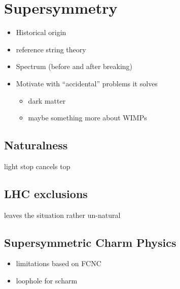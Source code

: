 \section{Supersymmetry}
\begin{itemize}
\item Historical origin
\item reference string theory
\item Spectrum (before and after breaking)
\item Motivate with ``accidental'' problems it solves
\begin{itemize}
  \item dark matter
  \item maybe something more about WIMPs
\end{itemize}
\end{itemize}

\subsection{Naturalness}
light stop cancels top
\subsection{LHC exclusions}
leaves the situation rather un-natural
\subsection{Supersymmetric Charm Physics}
\begin{itemize}
\item limitations based on FCNC
\item loophole for scharm
\end{itemize}
